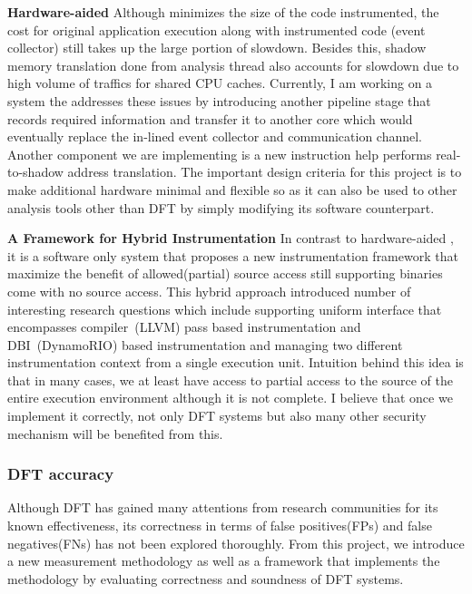 \documentclass[letterpaper, 10pt]{article}
\begin{document}
\begin{small}
%

{\bf Hardware-aided \SR} Although \SR minimizes the size of the code
instrumented, the cost for original application execution along with
instrumented code (event collector) still takes up the large portion of
slowdown.  Besides this, shadow memory translation done from analysis thread
also accounts for slowdown due to high volume of traffics for shared CPU
caches. 
%
Currently, I am working on a system the addresses these issues by introducing
another pipeline stage that records required information and transfer it to
another core which would eventually replace the in-lined event collector and
communication channel. Another component we are implementing is a new
instruction help performs real-to-shadow address translation. The important
design criteria for this project is to make additional hardware minimal and
flexible so as it can also be used to other analysis tools other than DFT by 
simply modifying its software counterpart.

{\bf A Framework for Hybrid Instrumentation} In contrast to hardware-aided \SR,
it is a software only system that proposes a new instrumentation framework that
maximize the benefit of allowed(partial) source access still supporting
binaries come with no source access. 
%
This hybrid approach introduced number of interesting research questions which
include supporting uniform interface that encompasses compiler~(LLVM) pass
based instrumentation and  DBI~(DynamoRIO) based instrumentation and managing
two different instrumentation context from a single execution unit. 
%
Intuition behind this idea is that in many cases, we at least
have access to partial access to the source of the entire execution environment
although it is not complete. I believe that once we implement it correctly, not
only DFT systems but also many other security mechanism will be benefited from
this.

\subsubsection*{DFT accuracy} 
%
Although DFT has gained many attentions from research communities for its known
effectiveness, its correctness in terms of false positives(FPs) and false
negatives(FNs) has not been explored thoroughly. From this project, we
introduce a new measurement methodology as well as a framework that implements
the methodology by evaluating correctness and soundness of DFT systems.
%


\end{small}
\end{document}
